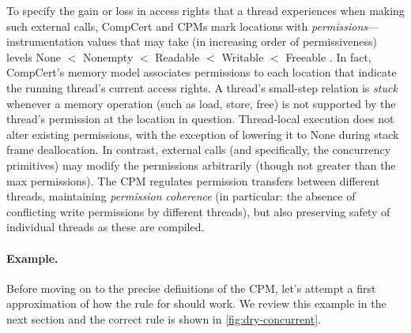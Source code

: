 To specify the gain or loss in access rights that a thread experiences
when making such external calls, CompCert and CPMs mark locations
with \emph{permissions}---instrumentation values that may take (in
increasing order of permissiveness) levels None $<$ Nonempty $<$
Readable $<$ Writable $<$ Freeable \cite{leroy14:mem}. In
fact, CompCert's memory model associates permissions to
each location that indicate
the running thread's current access rights. 
A thread's small-step relation is \emph{stuck} whenever a
memory operation (such as load, store, free) is not supported by the
thread's permission at the location in question.
Thread-local execution does not alter existing permissions, with the
exception of lowering it to
$\mathrm{None}$ during stack frame
deallocation. In contrast, external calls (and specifically, the
concurrency primitives) may modify the permissions arbitrarily
(though not greater than the max permissions). The CPM
regulates permission transfers between different threads, maintaining
\emph{permission coherence} (in particular: the
absence of conflicting write permissions by different threads), but also
preserving safety of individual threads as these are compiled.

\paragraph{Example.} Before moving on to the precise 
definitions of the CPM, let's attempt a first approximation of how the rule for
 should work. We review this example in the next section 
and the correct rule is shown in \cref{fig:dry-concurrent}.

